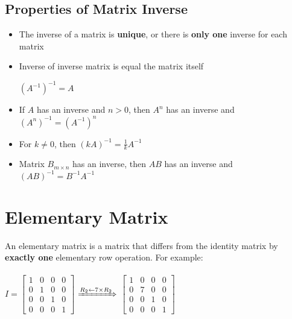 \documentclass[a4paper,12pt]{article}
\begin{document}
\subsection*{Properties of Matrix Inverse}
\begin{itemize}
  \item The inverse of a matrix is \textbf{unique}, or there is \textbf{only one} inverse for each matrix
  \item Inverse of inverse matrix is equal the matrix itself\begin{center}\((A^{-1})^{-1}=A\)\end{center}
  \item If \(A\) has an inverse and \(n>0\), then \(A^n\) has an inverse and \((A^n)^{-1}=(A^{-1})^n\)
  \item For \(k\neq 0\), then \((kA)^{-1}=\frac{1}{k}A^{-1}\)
  \item Matrix \(B_{m\times n}\) has an inverse, then \(AB\) has an inverse and \((AB)^{-1}=B^{-1}A^{-1}\)
\end{itemize}

\section*{Elementary Matrix}
An elementary matrix is a matrix that differs from the identity matrix by \textbf{exactly one} elementary row operation. For example: \\ \\
\(I=\begin{bmatrix}
  1 & 0 & 0 & 0 \\ 0 & 1 & 0 & 0 \\ 0 & 0 & 1 & 0 \\ 0 & 0 & 0 & 1
\end{bmatrix}\) $\xRightarrow{R_2 \leftarrow 7\times R_2}$ \(\begin{bmatrix}
  1 & 0 & 0 & 0 \\ 0 & 7 & 0 & 0 \\ 0 & 0 & 1 & 0 \\ 0 & 0 & 0 & 1
\end{bmatrix}\)
\end{document}
